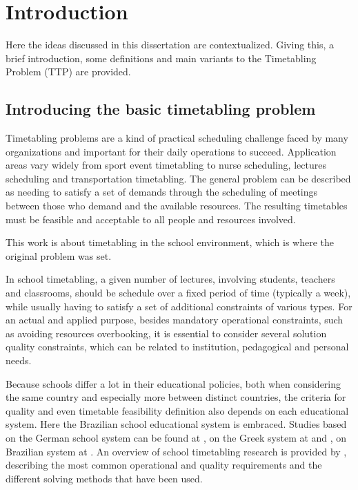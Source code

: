 \chapter{Introduction}
\label{chap:intro}


Here the ideas discussed in this dissertation are contextualized. Giving this, a brief introduction, some definitions and main variants to the Timetabling Problem (TTP) are provided.

\section{Introducing the basic timetabling problem}

Timetabling problems are a kind of practical scheduling challenge faced by many organizations and important for their daily operations to succeed. Application areas vary widely from sport event timetabling to nurse scheduling, lectures scheduling and transportation timetabling. The general problem can be described as needing to satisfy a set of demands through the scheduling of meetings between those who demand and the available resources. The resulting timetables must be feasible and acceptable to all people and resources involved.

This work is about timetabling in the school environment, which is where the original problem was set.

In school timetabling, a given number of lectures, involving students, teachers and classrooms, should be schedule over a fixed period of time (typically a week), while usually having to satisfy a set of additional constraints of various types. For an actual and applied purpose, besides mandatory operational constraints, such as avoiding resources overbooking, it is essential to consider several solution quality constraints, which can be related to institution, pedagogical and personal needs.

Because schools differ a lot in their educational policies, both when considering the same country and especially more between distinct countries, the criteria for quality and even timetable feasibility definition also depends on each educational system. Here the Brazilian school educational system is embraced. Studies based on the German school system can be found at \cite{Michael2002}, on the Greek system at \cite{Birbas1997} and \cite{Birbas2009}, on Brazilian system at \cite{Haroldo2012}. An overview of school timetabling research is provided by \cite{SchoolOverview2010}, describing the most common operational and quality requirements and the different solving methods that have been used.

